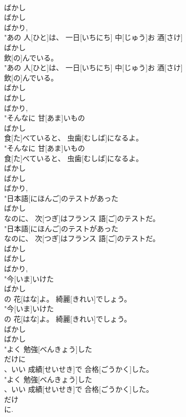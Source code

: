 \documentclass[8pt]{extreport}
\begin{document}
\begin{CJK}{UTF8}{min}
\\	ばかし 
\\	ばかし
\\	ばかり, 
\\	"あの 人[ひと]は、 一日[いちにち] 中[じゅう]お 酒[さけ]
\\	ばかし
\\	飲[の]んでいる。
\\	"あの 人[ひと]は、 一日[いちにち] 中[じゅう]お 酒[さけ]
\\	飲[の]んでいる。
\\	ばかし 
\\	ばかし
\\	ばかり, 
\\	"そんなに 甘[あま]いもの
\\	ばかし
\\	食[た]べていると、 虫歯[むしば]になるよ。
\\	"そんなに 甘[あま]いもの
\\	食[た]べていると、 虫歯[むしば]になるよ。
\\	ばかし 
\\	ばかし
\\	ばかり, 
\\	"日本語[にほんご]のテストがあった
\\	ばかし
\\	なのに、 次[つぎ]はフランス 語[ご]のテストだ。
\\	"日本語[にほんご]のテストがあった
\\	なのに、 次[つぎ]はフランス 語[ご]のテストだ。
\\	ばかし 
\\	ばかし
\\	ばかり, 
\\	"今[いま]いけた
\\	ばかし
\\	の 花[はな]よ。 綺麗[きれい]でしょう。
\\	"今[いま]いけた
\\	の 花[はな]よ。 綺麗[きれい]でしょう。
\\	ばかし 
\\	ばかし
\\	"よく 勉強[べんきょう]した
\\	だけに
\\	、いい 成績[せいせき]で 合格[ごうかく]した。
\\	"よく 勉強[べんきょう]した
\\	、いい 成績[せいせき]で 合格[ごうかく]した。
\\	だけ 
\\	に. 

\end{CJK}
\end{document}
